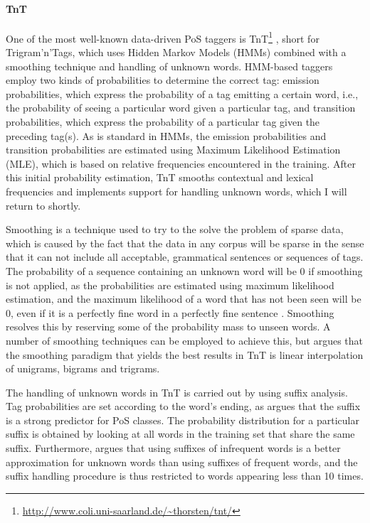 \documentclass[a4paper,12pt,english]{book}
\begin{document}
\paragraph{TnT}
One of the most well-known data-driven PoS taggers is
TnT\footnote{\url{http://www.coli.uni-saarland.de/~thorsten/tnt/}}
\cite{Bra:00}, short for Trigram'n'Tags, which uses Hidden Markov Models (HMMs)
combined with a smoothing technique and handling of unknown words. HMM-based
taggers employ two kinds of probabilities to determine the correct tag:
emission probabilities, which express the probability of a tag emitting a
certain word, i.e., the probability of seeing a particular word given a
particular tag, and transition probabilities, which express the probability of
a particular tag given the preceding tag(s). As is standard in HMMs, the
emission probabilities and transition probabilities are estimated using Maximum
Likelihood Estimation (MLE), which is based on relative frequencies encountered
in the training.  After this initial probability estimation, TnT smooths
contextual and lexical frequencies and implements support for handling unknown
words, which I will return to shortly.

Smoothing is a technique used to try to the solve the problem of sparse data,
which is caused by the fact that the data in any corpus will be sparse in the
sense that it can not include all acceptable, grammatical sentences or
sequences of tags.  The probability of a sequence containing an unknown word
will be 0 if smoothing is not applied, as the probabilities are estimated using
maximum likelihood estimation, and the maximum likelihood of a word that has
not been seen will be 0, even if it is a perfectly fine word in a perfectly
fine sentence \cite[pp.~131--132]{Jur:Mar:09}. Smoothing resolves this by
reserving some of the probability mass to unseen words. A number of smoothing
techniques can be employed to achieve this, but  argues that the
smoothing paradigm that yields the best results in TnT is linear interpolation
of unigrams, bigrams and trigrams.

The handling of unknown words in TnT is carried out by using suffix analysis.
Tag probabilities are set according to the word's ending, as 
argues that the suffix is a strong predictor for PoS classes. The probability
distribution for a particular suffix is obtained by looking at all words in the
training set that share the same suffix. Furthermore,  argues
that using suffixes of infrequent words is a better approximation for unknown
words than using suffixes of frequent words, and the suffix handling procedure
is thus restricted to words appearing less than 10 times.
\end{document}
